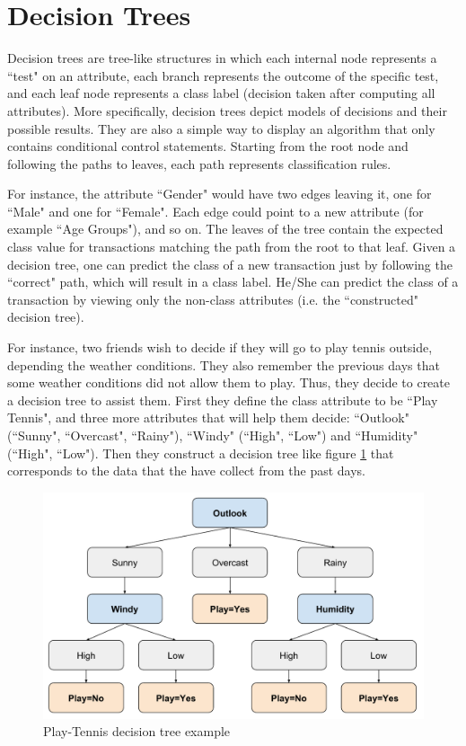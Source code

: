 \newpage
\section{Decision Trees}\label{s:decision-trees}

Decision trees are tree-like structures in which each internal node represents a ``test" on an attribute, each branch represents the outcome of the specific test, and each leaf node represents a class label (decision taken after computing all attributes).
More specifically, decision trees depict models of decisions and their possible results.
They are also a simple way to display an algorithm that only contains conditional control statements.
Starting from the root node and following the paths to leaves, each path represents classification rules.

For instance, the attribute ``Gender" would have two edges leaving it, one for ``Male" and
one for ``Female".
Each edge could point to a new attribute (for example ``Age Groups"), and so on.
The leaves of the tree contain the expected class value for transactions matching the path from the root to that leaf.
Given a decision tree, one can predict the class of a new transaction just by following the ``correct" path, which will result in a class label.
He/She can predict the class of a transaction by viewing only the non-class attributes (i.e. the ``constructed" decision tree).

For instance, two friends wish to decide if they will go to play tennis outside, depending the weather conditions.
They also remember the previous days that some weather conditions did not allow them to play.
Thus, they decide to create a decision tree to assist them.
First they define the class attribute to be ``Play Tennis", and three more attributes that will help them decide: ``Outlook" (``Sunny", ``Overcast", ``Rainy"), ``Windy" (``High", ``Low") and ``Humidity" (``High", ``Low").
Then they construct a decision tree like figure \ref{f:outlook} that corresponds to the data that the have collect from the past days.

\begin{figure}[th]
  \centering
  \includegraphics[width=0.8\linewidth]{figures/outlook.pdf}
  \caption{Play-Tennis decision tree example}\label{f:outlook}
\end{figure}

